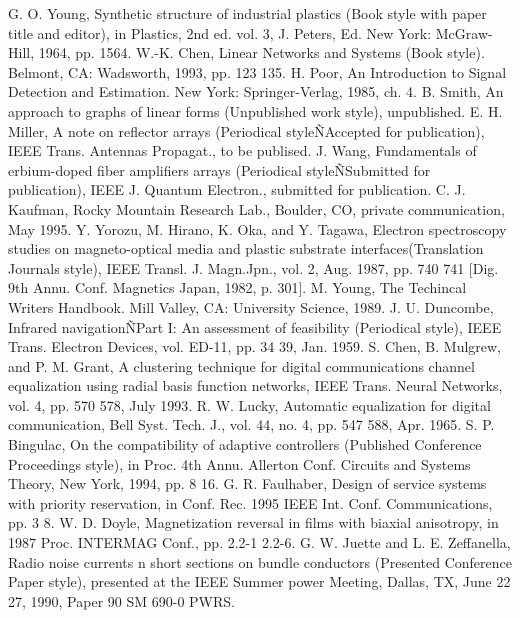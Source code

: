 \documentclass[letterpaper, 10 pt, conference]{ieeeconf}  %
\begin{document}
\begin{thebibliography}{99}

 G. O. Young,  Synthetic structure of industrial plastics (Book style with paper title and editor), in Plastics, 2nd ed. vol. 3, J. Peters, Ed.  New York: McGraw-Hill, 1964, pp. 1564.
 W.-K. Chen, Linear Networks and Systems (Book style).	Belmont, CA: Wadsworth, 1993, pp. 123 135.
 H. Poor, An Introduction to Signal Detection and Estimation.   New York: Springer-Verlag, 1985, ch. 4.
 B. Smith,  An approach to graphs of linear forms (Unpublished work style),  unpublished.
 E. H. Miller,  A note on reflector arrays (Periodical styleÑAccepted for publication),  IEEE Trans. Antennas Propagat., to be publised.
 J. Wang,  Fundamentals of erbium-doped fiber amplifiers arrays (Periodical styleÑSubmitted for publication),  IEEE J. Quantum Electron., submitted for publication.
 C. J. Kaufman, Rocky Mountain Research Lab., Boulder, CO, private communication, May 1995.
 Y. Yorozu, M. Hirano, K. Oka, and Y. Tagawa,  Electron spectroscopy studies on magneto-optical media and plastic substrate interfaces(Translation Journals style),  IEEE Transl. J. Magn.Jpn., vol. 2, Aug. 1987, pp. 740 741 [Dig. 9th Annu. Conf. Magnetics Japan, 1982, p. 301].
 M. Young, The Techincal Writers Handbook.  Mill Valley, CA: University Science, 1989.
 J. U. Duncombe,  Infrared navigationÑPart I: An assessment of feasibility (Periodical style),  IEEE Trans. Electron Devices, vol. ED-11, pp. 34 39, Jan. 1959.
 S. Chen, B. Mulgrew, and P. M. Grant,  A clustering technique for digital communications channel equalization using radial basis function networks,  IEEE Trans. Neural Networks, vol. 4, pp. 570 578, July 1993.
 R. W. Lucky,  Automatic equalization for digital communication,  Bell Syst. Tech. J., vol. 44, no. 4, pp. 547 588, Apr. 1965.
 S. P. Bingulac,  On the compatibility of adaptive controllers (Published Conference Proceedings style),  in Proc. 4th Annu. Allerton Conf. Circuits and Systems Theory, New York, 1994, pp. 8 16.
 G. R. Faulhaber,  Design of service systems with priority reservation,  in Conf. Rec. 1995 IEEE Int. Conf. Communications, pp. 3 8.
 W. D. Doyle,  Magnetization reversal in films with biaxial anisotropy,  in 1987 Proc. INTERMAG Conf., pp. 2.2-1 2.2-6.
 G. W. Juette and L. E. Zeffanella,  Radio noise currents n short sections on bundle conductors (Presented Conference Paper style),  presented at the IEEE Summer power Meeting, Dallas, TX, June 22 27, 1990, Paper 90 SM 690-0 PWRS.

\end{thebibliography}
\end{document}

